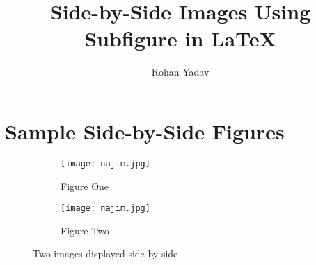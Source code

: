 \documentclass[12pt,a4paper]{article}
\title{Side-by-Side Images Using Subfigure in LaTeX}
\author{Rohan Yadav}
\date{}
\begin{document}
\maketitle

\section*{Sample Side-by-Side Figures}

\begin{figure}[h!]
    \centering
    \begin{subfigure}[b]{0.45\textwidth}
        \centering
        \texttt{[image: najim.jpg]}
        \caption{Figure One}
        \label{fig:one}
    \end{subfigure}
    \hfill
    \begin{subfigure}[b]{0.45\textwidth}
        \centering
        \texttt{[image: najim.jpg]}
        \caption{Figure Two}
        \label{fig:two}
    \end{subfigure}
    \caption{Two images displayed side-by-side}
    \label{fig:sidebyside}
\end{figure}
\end{document}
